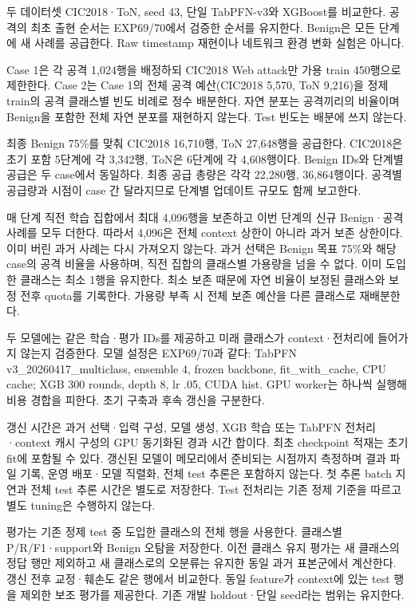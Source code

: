두 데이터셋 CIC2018·ToN, seed 43, 단일 TabPFN-v3와 XGBoost를 비교한다. 공격의 최초 출현 순서는 EXP69/\allowbreak{}70에서 검증한 순서를 유지한다. Benign은 모든 단계에 새 사례를 공급한다. Raw timestamp 재현이나 네트워크 환경 변화 실험은 아니다.

Case 1은 각 공격 1,024행을 배정하되 CIC2018 Web attack만 가용 train 450행으로 제한한다. Case 2는 Case 1의 전체 공격 예산(CIC2018 5,570, ToN 9,216)을 정제 train의 공격 클래스별 빈도 비례로 정수 배분한다. 자연 분포는 공격끼리의 비율이며 Benign을 포함한 전체 자연 분포를 재현하지 않는다. Test 빈도는 배분에 쓰지 않는다.

최종 Benign 75\%를 맞춰 CIC2018 16,710행, ToN 27,648행을 공급한다. CIC2018은 초기 포함 5단계에 각 3,342행, ToN은 6단계에 각 4,608행이다. Benign IDs와 단계별 공급은 두 case에서 동일하다. 최종 공급 총량은 각각 22,280행, 36,864행이다. 공격별 공급량과 시점이 case 간 달라지므로 단계별 업데이트 규모도 함께 보고한다.

매 단계 직전 학습 집합에서 최대 4,096행을 보존하고 이번 단계의 신규 Benign·공격 사례를 모두 더한다. 따라서 4,096은 전체 context 상한이 아니라 과거 보존 상한이다. 이미 버린 과거 사례는 다시 가져오지 않는다. 과거 선택은 Benign 목표 75\%와 해당 case의 공격 비율을 사용하며, 직전 집합의 클래스별 가용량을 넘을 수 없다. 이미 도입한 클래스는 최소 1행을 유지한다. 최소 보존 때문에 자연 비율이 보정된 클래스와 보정 전후 quota를 기록한다. 가용량 부족 시 전체 보존 예산을 다른 클래스로 재배분한다.

두 모델에는 같은 학습·평가 IDs를 제공하고 미래 클래스가 context·전처리에 들어가지 않는지 검증한다. 모델 설정은 EXP69/\allowbreak{}70과 같다: TabPFN v3\_\allowbreak{}20260417\_\allowbreak{}multiclass, ensemble 4, frozen backbone, fit\_\allowbreak{}with\_\allowbreak{}cache, CPU cache; XGB 300 rounds, depth 8, lr .05, CUDA hist. GPU worker는 하나씩 실행해 비용 경합을 피한다. 초기 구축과 후속 갱신을 구분한다.

갱신 시간은 과거 선택·입력 구성, 모델 생성, XGB 학습 또는 TabPFN 전처리·context 캐시 구성의 GPU 동기화된 경과 시간 합이다. 최초 checkpoint 적재는 초기 fit에 포함될 수 있다. 갱신된 모델이 메모리에서 준비되는 시점까지 측정하며 결과 파일 기록, 운영 배포·모델 직렬화, 전체 test 추론은 포함하지 않는다. 첫 추론 batch 지연과 전체 test 추론 시간은 별도로 저장한다. Test 전처리는 기존 정제 기준을 따르고 별도 tuning은 수행하지 않는다.

평가는 기존 정제 test 중 도입한 클래스의 전체 행을 사용한다. 클래스별 P/\allowbreak{}R/\allowbreak{}F1·support와 Benign 오탐을 저장한다. 이전 클래스 유지 평가는 새 클래스의 정답 행만 제외하고 새 클래스로의 오분류는 유지한 동일 과거 표본군에서 계산한다. 갱신 전후 교정·훼손도 같은 행에서 비교한다. 동일 feature가 context에 있는 test 행을 제외한 보조 평가를 제공한다. 기존 개발 holdout·단일 seed라는 범위는 유지한다.

